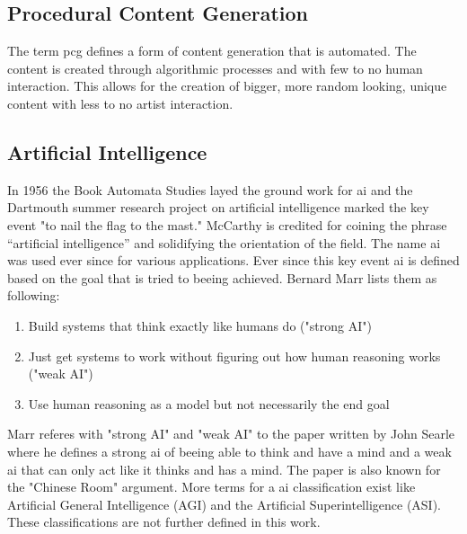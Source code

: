 \documentclass[10pt,a4paper]{article}
\begin{document}
\subsection{Procedural Content Generation}
The term \gls{pcg} defines a form of content generation that is automated. The content is created through algorithmic processes and with few to no human interaction. This allows for the creation of bigger, more random looking, unique content with less to no artist interaction.\cite{VanderLinden2014}

\subsection{Artificial Intelligence}
In 1956 the Book Automata Studies\cite{McCarthy1956} layed the ground work for \gls{ai} and the Dartmouth summer research project on artificial intelligence marked the key event "to nail the flag to the mast." McCarthy is credited for coining the phrase “artificial intelligence” and solidifying the orientation of the field\cite{moor2006dartmouth}. The name \gls{ai} was used ever since for various applications. Ever since this key event \gls{ai} is defined based on the goal that is tried to beeing achieved. Bernard Marr lists them as following:\cite{Marr2018}
\begin{enumerate}
\item Build systems that think exactly like humans do ("strong AI") 
\item Just get systems to work without figuring out how human reasoning works ("weak AI")
\item Use human reasoning as a model but not necessarily the end goal
\end{enumerate}
Marr referes with "strong AI" and "weak AI" to the paper written by John Searle where he defines a strong \gls{ai} of beeing able to think and have a mind and a weak \gls{ai} that can only act like it thinks and has a mind. The paper is also known for the "Chinese Room" argument\cite{Searle1980}. More terms for a \gls{ai} classification exist like Artificial General Intelligence (AGI) and the Artificial Superintelligence (ASI). These classifications are not further defined in this work.
\end{document}

